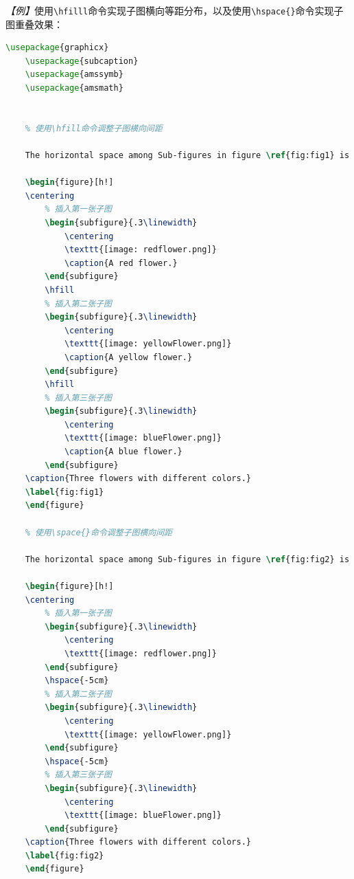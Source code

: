 \emph{【例】}使用\texttt{\textbackslash{}hfilll}命令实现子图横向等距分布，以及使用\texttt{\textbackslash{}hspace\{\}}命令实现子图重叠效果：
\begin{lstlisting}[language=TeX]
    \usepackage{graphicx}
    \usepackage{subcaption}
    \usepackage{amssymb}
    \usepackage{amsmath}
    

    % 使用\hfill命令调整子图横向间距

    The horizontal space among Sub-figures in figure \ref{fig:fig1} is controlled by $\backslash$\textit{hfill}.

    \begin{figure}[h!]
    \centering
        % 插入第一张子图
        \begin{subfigure}{.3\linewidth}
            \centering
            \texttt{[image: redflower.png]}
            \caption{A red flower.}
        \end{subfigure}
        \hfill
        % 插入第二张子图
        \begin{subfigure}{.3\linewidth}
            \centering
            \texttt{[image: yellowFlower.png]}
            \caption{A yellow flower.}
        \end{subfigure}
        \hfill
        % 插入第三张子图
        \begin{subfigure}{.3\linewidth}
            \centering
            \texttt{[image: blueFlower.png]}
            \caption{A blue flower.}
        \end{subfigure}
    \caption{Three flowers with different colors.}
    \label{fig:fig1}
    \end{figure}

    % 使用\space{}命令调整子图横向间距

    The horizontal space among Sub-figures in figure \ref{fig:fig2} is controlled by $\backslash$\textit{space}.

    \begin{figure}[h!]
    \centering
        % 插入第一张子图
        \begin{subfigure}{.3\linewidth}
            \centering
            \texttt{[image: redflower.png]}
        \end{subfigure}
        \hspace{-5cm}
        % 插入第二张子图
        \begin{subfigure}{.3\linewidth}
            \centering
            \texttt{[image: yellowFlower.png]}
        \end{subfigure}
        \hspace{-5cm}
        % 插入第三张子图
        \begin{subfigure}{.3\linewidth}
            \centering
            \texttt{[image: blueFlower.png]}
        \end{subfigure}
    \caption{Three flowers with different colors.}
    \label{fig:fig2}
    \end{figure}

    
\end{lstlisting}


